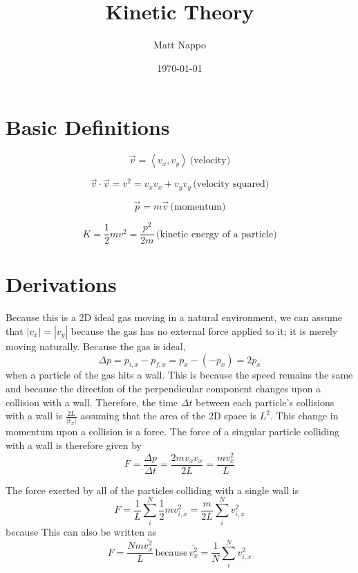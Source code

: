 \documentclass{article}
\title{Kinetic Theory}
\author{Matt Nappo}
\date{\today}
\begin{document}
\maketitle

\section{Basic Definitions}
$$\vec{v} = \left< v_x, v_y \right> \,\text{(velocity)}$$

$$\vec{v} \cdot \vec{v} = v^2 = v_xv_x + v_yv_y \,\text{(velocity squared)}$$

$$\vec{p} = m\vec{v} \,\text{(momentum)}$$

$$K = \frac{1}{2}mv^2 = \frac{p^2}{2m} \,\text{(kinetic energy of a particle)}$$


\section{Derivations}
Because this is a 2D ideal gas moving in a natural environment, we can assume that $|v_x| = |v_y|$ because the gas has no external force applied to it; it is merely moving naturally.
Because the gas is ideal, $$\Delta p = p_{i,x} - p_{f,x} = p_x - (-p_x) = 2p_x$$ when a particle of the gas hits a wall. This is because the speed remains the same and because the direction of the perpendicular component changes upon a collision with a wall.
Therefore, the time $\Delta t$ between each particle's collisions with a wall is $\frac{2L}{|v_x|}$ assuming that the area of the 2D space is $L^2$.
This change in momentum upon a collision is a force. The force of a singular particle colliding with a wall is therefore given by
$$F = \frac{\Delta p}{\Delta t} = \frac{2mv_xv_x}{2L} = \frac{mv_x^2}{L}$$

The force exerted by all of the particles colliding with a single wall is
$$F = \frac{1}{L} \sum_i^N \frac{1}{2}mv_{i,x}^2 = \frac{m}{2L} \sum_i^N v_{i,x}^2$$
because
This can also be written as
$$F = \frac{Nm\overline{v_x^2}}{L}\, \text{because}\, \overline{v_x^2} = \frac{1}{N}\sum_i^N v_{i,x}^2$$
\end{document}
